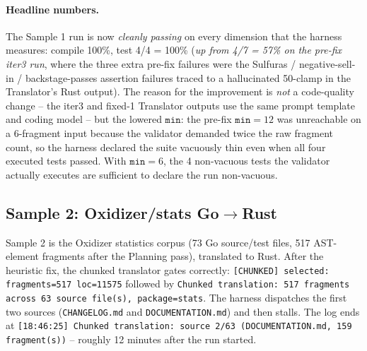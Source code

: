 \paragraph{Headline numbers.}
The Sample 1 run is now \emph{cleanly passing} on every dimension
that the harness measures: compile 100\%, test 4/4 = 100\%
(\emph{up from 4/7 = 57\% on the pre-fix iter3 run}, where the
three extra pre-fix failures were the Sulfuras / negative-sell-in
/ backstage-passes assertion failures traced to a hallucinated
50-clamp in the Translator's Rust output). The reason for the
improvement is \emph{not} a code-quality change -- the iter3 and
fixed-1 Translator outputs use the same prompt template and
coding model -- but the lowered $\texttt{min}$: the pre-fix
$\texttt{min} = 12$ was unreachable on a 6-fragment input because
the validator demanded twice the raw fragment count, so the
harness declared the suite vacuously thin even when all four
executed tests passed. With $\texttt{min} = 6$, the 4 non-vacuous
tests the validator actually executes are sufficient to declare
the run non-vacuous.

\subsection{Sample 2: Oxidizer/stats Go$\rightarrow$Rust}

Sample 2 is the Oxidizer statistics corpus (73 Go source/test
files, 517 AST-element fragments after the Planning pass), translated
to Rust. After the heuristic fix, the chunked translator gates
correctly: \texttt{[CHUNKED] selected: fragments=517 loc=11575}
followed by \texttt{Chunked translation: 517 fragments across 63
source file(s), package=stats}. The harness dispatches the first
two sources (\texttt{CHANGELOG.md} and \texttt{DOCUMENTATION.md})
and then stalls. The log ends at
\texttt{[18:46:25] Chunked translation: source 2/63 (DOCUMENTATION.md,
159 fragment(s))} -- roughly 12 minutes after the run started.

